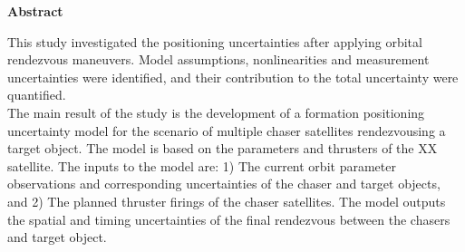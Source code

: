 \begin{center}
    \large
    \textbf{Abstract}
\end{center}{}
This study investigated the positioning uncertainties after applying orbital rendezvous maneuvers. Model assumptions, nonlinearities and measurement uncertainties were identified, and their contribution to the total uncertainty were quantified. \\

The main result of the study is the development of a formation positioning uncertainty model for the scenario of multiple chaser satellites rendezvousing a target object. The model is based on the parameters and thrusters of the XX satellite. The inputs to the model are: 1) The current orbit parameter observations and corresponding uncertainties of the chaser and target objects, and 2) The planned thruster firings of the chaser satellites. The model outputs the spatial and timing uncertainties of the final rendezvous between the chasers and target object. \\
